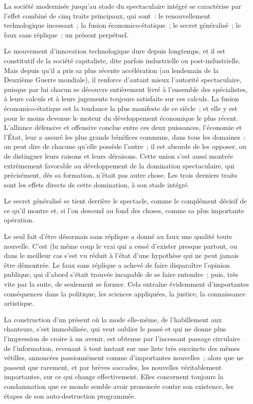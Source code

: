 \documentclass[french,twoside]{book} %
\begin{document}
\noindent La société modernisée jusqu’au stade du spectaculaire intégré se caractérise par l’effet combiné de cinq traits principaux, qui sont : le renouvellement technologique incessant ; la fusion économico-étatique ; le secret généralisé ; le faux sans réplique ; un présent perpétuel.\par
Le mouvement d’innovation technologique dure depuis longtemps, et il est constitutif de la société capitaliste, dite parfois industrielle ou post-industrielle. Mais depuis qu’il a pris sa plus récente accélération (au lendemain de la Deuxième Guerre mondiale), il renforce d’autant mieux l’autorité spectaculaire, puisque par lui chacun se découvre entièrement livré à l’ensemble des spécialistes, à leurs calculs et à leurs jugements toujours satisfaits sur ces calculs. La fusion économico-étatique est la tendance la plus manifeste de ce siècle ; et elle y est pour le moins devenue le moteur du développement économique le plus récent. L’alliance défensive et offensive conclue entre ces deux puissances, l’économie et l’État, leur a assuré les plus grands bénéfices communs, dans tous les domaines : on peut dire de chacune qu’elle possède l’autre ; il est absurde de les opposer, ou de distinguer leurs raisons et leurs déraisons. Cette union s’est aussi montrée extrêmement favorable au développement de la domination spectaculaire, qui précisément, dès sa formation, n’était pas autre chose. Les trois derniers traits sont les effets directs de cette domination, à son stade intégré.\par
Le secret généralisé se tient derrière le spectacle, comme le complément décisif de ce qu’il montre et, si l’on descend au fond des choses, comme sa plus importante opération.\par
Le seul fait d’être désormais sans réplique a donné au faux une qualité toute nouvelle. C’est (lu même coup le vrai qui a cessé d’exister presque partout, ou dans le meilleur cas s’est vu réduit à l’état d’une hypothèse qui ne peut jamais être démontrée. Le faux sans réplique a achevé de faire disparaître l’opinion publique, qui d’abord s’était trouvée incapable de se faire entendre ; puis, très vite par la suite, de seulement se former. Cela entraîne évidemment d’importantes conséquences dans la politique, les sciences appliquées, la justice, la connaissance artistique.\par
La construction d’un présent où la mode elle-même, de l’habillement aux chanteurs, s’est immobilisée, qui veut oublier le passé et qui ne donne plus l’impression de croire à un avenir, est obtenue par l’incessant passage circulaire de l’information, revenant à tout instant sur une liste très succincte des mêmes vétilles, annoncées passionnément comme d’importantes nouvelles ; alors que ne passent que rarement, et par brèves saccades, les nouvelles véritablement importantes, sur ce qui change effectivement. Elles concernent toujours la condamnation que ce monde semble avoir prononcée contre son existence, les étapes de son auto-destruction programmée.\par
\end{document}
